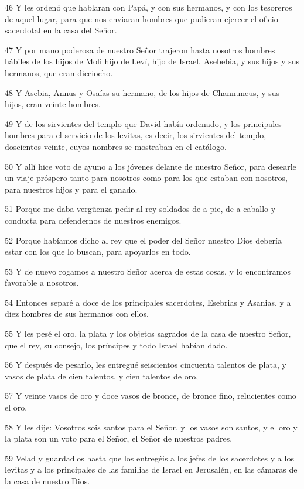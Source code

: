 \par 46 Y les ordenó que hablaran con Papá, y con sus hermanos, y con los tesoreros de aquel lugar, para que nos enviaran hombres que pudieran ejercer el oficio sacerdotal en la casa del Señor.
\par 47 Y por mano poderosa de nuestro Señor trajeron hasta nosotros hombres hábiles de los hijos de Moli hijo de Leví, hijo de Israel, Asebebia, y sus hijos y sus hermanos, que eran dieciocho.
\par 48 Y Asebia, Annus y Osaías su hermano, de los hijos de Channuneus, y sus hijos, eran veinte hombres.
\par 49 Y de los sirvientes del templo que David había ordenado, y los principales hombres para el servicio de los levitas, es decir, los sirvientes del templo, doscientos veinte, cuyos nombres se mostraban en el catálogo.
\par 50 Y allí hice voto de ayuno a los jóvenes delante de nuestro Señor, para desearle un viaje próspero tanto para nosotros como para los que estaban con nosotros, para nuestros hijos y para el ganado.
\par 51 Porque me daba vergüenza pedir al rey soldados de a pie, de a caballo y conducta para defendernos de nuestros enemigos.
\par 52 Porque habíamos dicho al rey que el poder del Señor nuestro Dios debería estar con los que lo buscan, para apoyarlos en todo.
\par 53 Y de nuevo rogamos a nuestro Señor acerca de estas cosas, y lo encontramos favorable a nosotros.
\par 54 Entonces separé a doce de los principales sacerdotes, Esebrias y Asanias, y a diez hombres de sus hermanos con ellos.
\par 55 Y les pesé el oro, la plata y los objetos sagrados de la casa de nuestro Señor, que el rey, su consejo, los príncipes y todo Israel habían dado.
\par 56 Y después de pesarlo, les entregué seiscientos cincuenta talentos de plata, y vasos de plata de cien talentos, y cien talentos de oro,
\par 57 Y veinte vasos de oro y doce vasos de bronce, de bronce fino, relucientes como el oro.
\par 58 Y les dije: Vosotros sois santos para el Señor, y los vasos son santos, y el oro y la plata son un voto para el Señor, el Señor de nuestros padres.
\par 59 Velad y guardadlos hasta que los entregéis a los jefes de los sacerdotes y a los levitas y a los principales de las familias de Israel en Jerusalén, en las cámaras de la casa de nuestro Dios.
